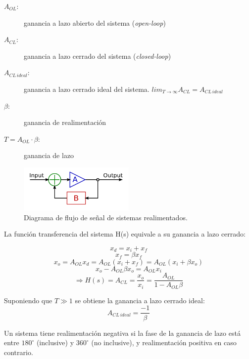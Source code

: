 \documentclass[../../main.tex]{subfiles}
\begin{document}
\begin{description}
	\item[$A_{OL}$:] ganancia a lazo abierto del sistema (\textit{open-loop})
	\item[$A_{CL}$:] ganancia a lazo cerrado del sistema (\textit{closed-loop})
	\item[$A_{CL\,ideal}$:] ganancia a lazo cerrado ideal del sistema. $lim_{T\rightarrow \infty}A_{CL} = A_{CL\,ideal}$
	\item[$\beta$:] ganancia de realimentaci\'on
	\item[$T=A_{OL}\cdot\beta$:] ganancia de lazo
\end{description}

\begin{figure}[htbp] %
	\centering
	\includegraphics[width=0.5\textwidth]{imagenes/Ideal_feedback_model.png}
	\caption{Diagrama de flujo de se\~nal de sistemas realimentados.}
	\label{fig:ej_3_realimentacion}
\end{figure}


La funci\'on transferencia del sistema H(s) equivale a su ganancia a lazo cerrado:

\[x_d = x_i+x_f\]
\[x_f = \beta x_f\]
\[x_o = A_{OL}x_d = A_{OL}\left( x_i+x_f \right) =  A_{OL}\left( x_i+\beta x_o \right)\]
\[x_o - A_{OL} \beta x_o = A_{OL} x_i\]
\begin{equation}
	\Rightarrow H(s) = A_{CL} = \frac{x_o}{x_i} = \frac{A_{OL}}{1-A_{OL}\beta}
	\label{eq:ej_3_ACL}
\end{equation}

Suponiendo que $T\gg 1$ se obtiene la ganancia a lazo cerrado ideal:
\begin{equation}
	A_{CL\,ideal} = \frac{-1}{\beta}
	\label{eq:ej_3_ACL_IDEAL}
\end{equation}

Un sistema tiene realimentaci\'on negativa si la fase de la ganancia de lazo est\'a entre $180^\circ$ (inclusive) y $360^\circ$ (no inclusive), y realimentaci\'on positiva en caso contrario.
\end{document}

